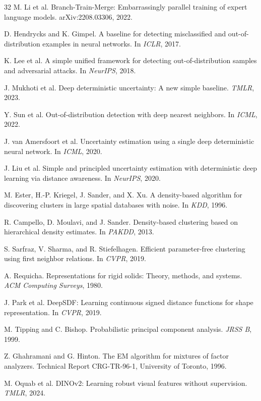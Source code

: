 \documentclass[12pt,oneside]{report}
\begin{document}
\begin{thebibliography}{32}
M. Li et al.
\newblock Branch-Train-Merge: Embarrassingly parallel training of expert
language models.
\newblock arXiv:2208.03306, 2022.

D. Hendrycks and K. Gimpel.
\newblock A baseline for detecting misclassified and out-of-distribution
examples in neural networks.
\newblock In \emph{ICLR}, 2017.

K. Lee et al.
\newblock A simple unified framework for detecting out-of-distribution samples
and adversarial attacks.
\newblock In \emph{NeurIPS}, 2018.

J. Mukhoti et al.
\newblock Deep deterministic uncertainty: A new simple baseline.
\newblock \emph{TMLR}, 2023.

Y. Sun et al.
\newblock Out-of-distribution detection with deep nearest neighbors.
\newblock In \emph{ICML}, 2022.

J. van Amersfoort et al.
\newblock Uncertainty estimation using a single deep deterministic neural
network.
\newblock In \emph{ICML}, 2020.

J. Liu et al.
\newblock Simple and principled uncertainty estimation with deterministic deep
learning via distance awareness.
\newblock In \emph{NeurIPS}, 2020.

M. Ester, H.-P. Kriegel, J. Sander, and X. Xu.
\newblock A density-based algorithm for discovering clusters in large spatial
databases with noise.
\newblock In \emph{KDD}, 1996.

R. Campello, D. Moulavi, and J. Sander.
\newblock Density-based clustering based on hierarchical density estimates.
\newblock In \emph{PAKDD}, 2013.

S. Sarfraz, V. Sharma, and R. Stiefelhagen.
\newblock Efficient parameter-free clustering using first neighbor relations.
\newblock In \emph{CVPR}, 2019.

A. Requicha.
\newblock Representations for rigid solids: Theory, methods, and systems.
\newblock \emph{ACM Computing Surveys}, 1980.

J. Park et al.
\newblock DeepSDF: Learning continuous signed distance functions for shape
representation.
\newblock In \emph{CVPR}, 2019.

M. Tipping and C. Bishop.
\newblock Probabilistic principal component analysis.
\newblock \emph{JRSS B}, 1999.

Z. Ghahramani and G. Hinton.
\newblock The EM algorithm for mixtures of factor analyzers.
\newblock Technical Report CRG-TR-96-1, University of Toronto, 1996.

M. Oquab et al.
\newblock DINOv2: Learning robust visual features without supervision.
\newblock \emph{TMLR}, 2024.

\end{thebibliography}
\end{document}

